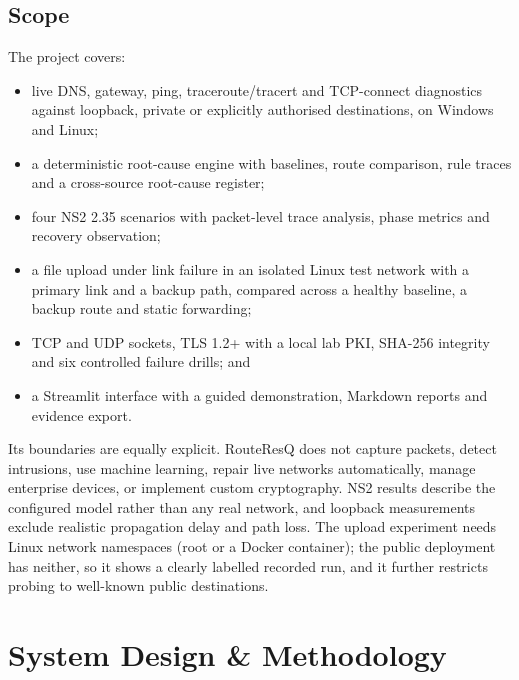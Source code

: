 \documentclass[12pt,a4paper]{report}
\numberwithin{equation}{chapter}
\begin{document}
\section{Scope}
The project covers:
\begin{itemize}
  \item live DNS, gateway, ping, traceroute/tracert and TCP-connect diagnostics against loopback, private or explicitly authorised destinations, on Windows and Linux;
  \item a deterministic root-cause engine with baselines, route comparison, rule traces and a cross-source root-cause register;
  \item four NS2 2.35 scenarios with packet-level trace analysis, phase metrics and recovery observation;
  \item a file upload under link failure in an isolated Linux test network with a primary link and a backup path, compared across a healthy baseline, a backup route and static forwarding;
  \item TCP and UDP sockets, TLS 1.2+ with a local lab PKI, SHA-256 integrity and six controlled failure drills; and
  \item a Streamlit interface with a guided demonstration, Markdown reports and evidence export.
\end{itemize}
Its boundaries are equally explicit. RouteResQ does not capture packets, detect intrusions, use machine learning, repair live networks automatically, manage enterprise devices, or implement custom cryptography. NS2 results describe the configured model rather than any real network, and loopback measurements exclude realistic propagation delay and path loss. The upload experiment needs Linux network namespaces (root or a Docker container); the public deployment has neither, so it shows a clearly labelled recorded run, and it further restricts probing to well-known public destinations.

\chapter{System Design \& Methodology}
\end{document}
